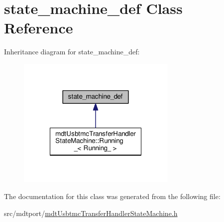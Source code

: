 \hypertarget{classstate__machine__def}{\section{state\-\_\-machine\-\_\-def Class Reference}
\label{classstate__machine__def}
}


Inheritance diagram for state\-\_\-machine\-\_\-def\-:\nopagebreak
\begin{figure}[H]
\begin{center}
\leavevmode
\includegraphics[width=216pt]{classstate__machine__def__inherit__graph}
\end{center}
\end{figure}


The documentation for this class was generated from the following file\-:\begin{DoxyCompactItemize}
\item 
src/mdtport/\hyperlink{mdt_usbtmc_transfer_handler_state_machine_8h}{mdt\-Usbtmc\-Transfer\-Handler\-State\-Machine.\-h}\end{DoxyCompactItemize}
